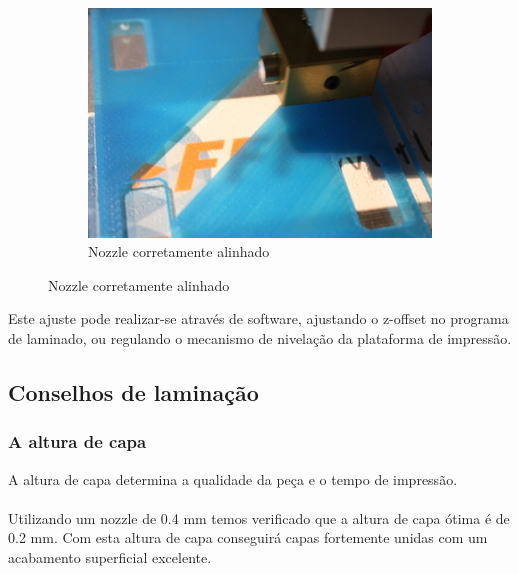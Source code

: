 \documentclass[11pt,a4paper]{article}
\begin{document}
\begin{figure}[H]
\begin{subfigure}[b]{0.3\textwidth}
        \includegraphics[width=\textwidth,cfbox=azul_marcos 3pt 0pt]{FOTOS/HOTENDPERFECTO}
	\caption*{Nozzle corretamente alinhado}
    \end{subfigure}
\end{figure}
Este ajuste pode realizar-se através de software, ajustando o z-offset no programa de laminado, ou regulando o mecanismo de nivelação da plataforma de impressão.
	\subsection{Conselhos de laminação}
		\subsubsection{A altura de capa}
A altura de capa determina a qualidade da peça e o tempo de impressão.
\\\\
Utilizando um nozzle de 0.4 mm temos verificado que a altura de capa ótima é de 0.2 mm. Com esta altura de capa conseguirá capas fortemente unidas com um acabamento superficial excelente.
\end{document}
